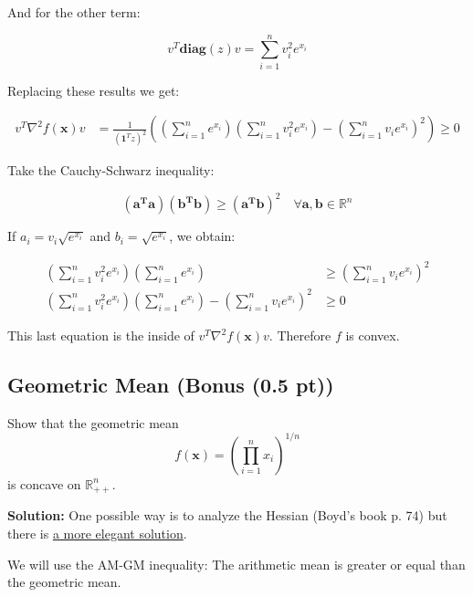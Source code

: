 \documentclass{article}
\begin{document}
And for the other term:

\begin{equation}
    v^T \bm{diag}(z) v = \sum_{i=1}^{n} v_i^2 e^{x_i}
\end{equation}

Replacing these results we get:

\begin{align}
    v^T \nabla^2 f(\bm{x}) v & = \frac{1}{(\bm{1}^{T} z)^2} \left( \left( \sum_{i=1}^{n} e^{x_i} \right) \left( \sum_{i=1}^{n} v_i^2 e^{x_i} \right) - \left( \sum_{i=1}^{n} v_i e^{x_i} \right)^2 \right) \geq 0
\end{align}

Take the Cauchy-Schwarz inequality:

\begin{equation}
    (\bm{a^T} \bm{a}) (\bm{b^T} \bm{b}) \geq (\bm{a^T} \bm{b})^2 \quad \forall \bm{a}, \bm{b} \in \mathbb{R}^n
\end{equation}

If $ a_i = v_i \sqrt{e^{x_i}} $ and $ b_i = \sqrt{e^{x_i}} $, we obtain:

\begin{align}
    \left( \sum_{i=1}^{n} v_i^2 e^{x_i} \right) \left( \sum_{i=1}^{n} e^{x_i} \right)                                               & \geq \left( \sum_{i=1}^{n} v_i e^{x_i} \right)^2 \\
    \left( \sum_{i=1}^{n} v_i^2 e^{x_i} \right) \left( \sum_{i=1}^{n} e^{x_i} \right) - \left( \sum_{i=1}^{n} v_i e^{x_i} \right)^2 & \geq 0
\end{align}

This last equation is the inside of $ v^T \nabla^2 f(\bm{x}) v $. Therefore $f$ is convex.

\subsection*{Geometric Mean (Bonus (0.5 pt))}

Show that the geometric mean
\[
    f(\bm{x}) = \left( \prod_{i=1}^{n} x_i \right)^{1/n}
\]
is concave on $\mathbb{R}_{++}^n$.

\textbf{Solution:} One possible way is to analyze the Hessian (Boyd's book p. 74) but there is \href{https://math.stackexchange.com/questions/3839629/how-to-prove-the-geometric-mean-is-concave/3839952#3839952}{a more elegant solution}.

We will use the AM-GM inequality: The arithmetic mean is greater or equal than the geometric mean.
\end{document}
